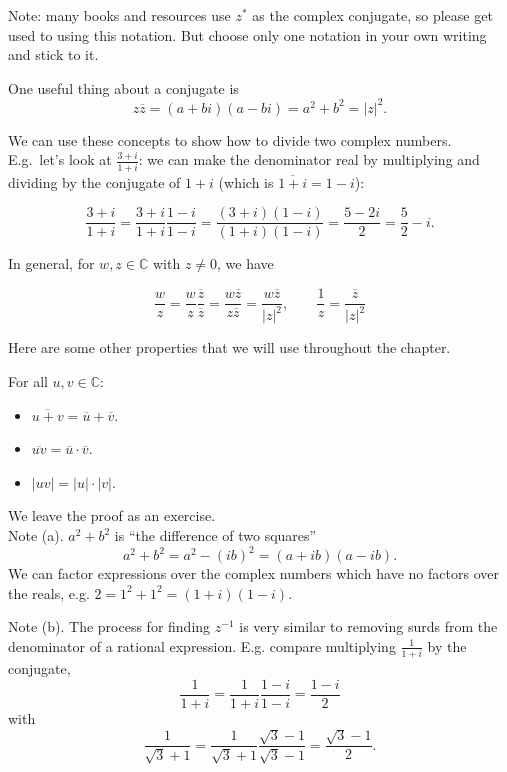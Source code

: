 \documentclass[11pt,dvipsnames]{book}
\numberwithin{figure}{section} %
\numberwithin{table}{section} %
\begin{document}
Note: many books and resources use \(z^*\) as the complex conjugate, so please get used to using this notation.  But choose only one notation in your own writing and stick to it.

One useful thing about a conjugate is
\[z\overline{z} = (a+bi)(a-bi) = a^2 + b^2 = |z|^2.\]

We can use these concepts to show how to divide two complex numbers.  E.g.~let's look at $\frac{3+i}{1+i}$: we can make the denominator real by multiplying and dividing by the conjugate of $1+i$ (which is $\overline{1+i}=1-i$):

$$\frac{3+i}{1+i}=\frac{3+i}{1+i}\frac{1-i}{1-i} = \frac{(3+i)(1-i)}{(1+i)(1-i)} = \frac{5-2i}{2}=\frac{5}{2}-i.
$$

In general, for $w,z\in\mathbb{C}$ with $z\neq 0$, we have

\begin{equation}
\label{e:1/z}
 \frac{w}{z} = \frac{w}{z}\frac{\overline z}{\overline z} = \frac{w\overline z}{z\overline z} = \frac{w\overline z}{|z|^2}, \;\; \;\;\;\;\;\frac{1}{z} = \frac{\overline{z}}{|z|^2}
 \end{equation}

Here are some other properties that we will use throughout the chapter.

\begin{lemma}
\label{l:modulus-rules}
For all $u,v\in \mathbb{C}$:
\begin{itemize}
\item $\overline{u+v} = \overline{u}+\overline{v}$.
\item $\overline{uv} = \overline{u}\cdot\overline{v}$.
\item $|uv|=|u|\cdot|v|$.
\end{itemize}
\end{lemma}

We leave the proof as an exercise.\\

Note (a).  \(a^2+b^2\) is ``the difference of two squares''
\[ a^2+b^2 = a^2-(ib)^2 = (a+ib)(a-ib).\]
We can factor expressions over the complex numbers which have no factors over the reals, e.g. \(2=1^2+1^2=(1+i)(1-i)\).

Note (b). The process for finding \(z^{-1}\) is very similar to removing surds from the denominator of a rational expression.
E.g. compare multiplying \(\frac{1}{1+i}\) by the conjugate, \[ \frac{1}{1+i} = \frac{1}{1+i}\frac{1-i}{1-i}= \frac{1-i}{2}\]
with
\[ \frac{1}{\sqrt{3}+1} = \frac{1}{\sqrt{3}+1}\frac{\sqrt{3}-1}{\sqrt{3}-1}= \frac{\sqrt{3}-1}{2} .\]
\end{document}
